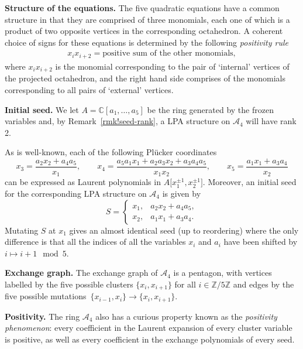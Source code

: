 \documentclass[pdftex]{sigma}
\numberwithin{equation}{section}
\theoremstyle{definition}
\newcommand{\CC}{\mathbb{C}}
\newcommand{\ZZ}{\mathbb{Z}}
\begin{document}
{\bf Structure of the equations.}
The five quadratic equations have a common structure in that they are comprised of three monomials, each one of which is a product of two opposite vertices in the corresponding octahedron. A coherent choice of signs for these equations is determined by the following \emph{positivity rule}
\begin{gather} x_ix_{i+2}=\text{positive sum of the other monomials}, \label{eq!positivity} \end{gather}
where $x_ix_{i+2}$ is the monomial corresponding to the pair of `internal' vertices of the projected octahedron, and the right hand side comprises of the monomials corresponding to all pairs of `external' vertices.

{\bf Initial seed.}
We let $A= \CC[a_1,\ldots,a_5]$ be the ring generated by the frozen variables and, by Remark~\ref{rmk!seed-rank}, a LPA structure on $\mathcal A_4$ will have rank 2.

As is well-known, each of the following Pl\"ucker coordinates
\[ x_3 = \frac{a_2x_2 + a_4a_5}{x_1}, \qquad x_4 = \frac{a_5a_1x_1 + a_2a_3x_2 + a_3a_4a_5}{x_1x_2}, \qquad x_5 = \frac{a_1x_1 + a_3a_4}{x_2} \]
can be expressed as Laurent polynomials in $A\big[x_1^{\pm1},x_2^{\pm1}\big]$. Moreover, an initial seed for the corresponding LPA structure on $\mathcal A_4$ is given by
\[ S = \begin{cases}
x_1, & a_2x_2 + a_4a_5, \\
x_2, & a_1x_1 + a_3a_4.
\end{cases} \]
Mutating $S$ at $x_1$ gives an almost identical seed (up to reordering) where the only difference is that all the indices of all the variables $x_i$ and $a_i$ have been shifted by $i\mapsto i+1\mod 5$.

{\bf Exchange graph.}
The exchange graph of $\mathcal A_4$ is a pentagon, with vertices labelled by the five possible clusters $\{x_i,x_{i+1}\}$ for all $i\in \ZZ/5\ZZ$ and edges by the five possible mutations~${\{x_{i-1},x_i\}\to\{x_i,x_{i+1}\}}$.

{\bf Positivity.}
The ring $\mathcal A_4$ also has a curious property known as the \emph{positivity phenomenon}: every coefficient in the Laurent expansion of every cluster variable is positive, as well as every coefficient in the exchange polynomials of every seed.
\end{document}
